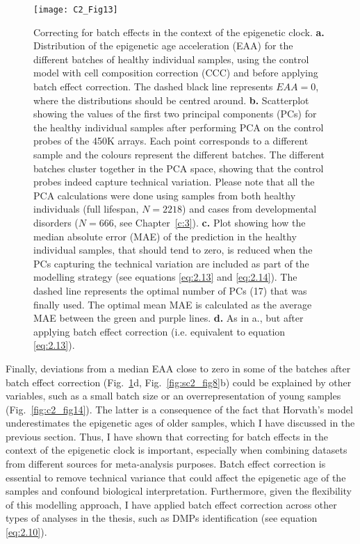 \begin{figure}[htbp!] 
	\centering
	\texttt{[image: C2\_Fig13]}
	\vspace*{2mm}    
	\caption[Correcting for batch effects in the context of the epigenetic clock]{Correcting for batch effects in the context of the epigenetic clock. \textbf{a.} Distribution of the epigenetic age acceleration (EAA) for the different batches of healthy individual samples, using the control model with cell composition correction (CCC) and before applying batch effect correction. The dashed black line represents $EAA = 0$, where the distributions should be centred around. \textbf{b.} Scatterplot showing the values of the first two principal components (PCs) for the healthy individual samples after performing PCA on the control probes of the 450K arrays. Each point corresponds to a different sample and the colours represent the different batches. The different batches cluster together in the PCA space, showing that the control probes indeed capture technical variation. Please note that all the PCA calculations were done using samples from both healthy individuals (full lifespan, $N=2218$) and cases from developmental disorders ($N=666$, see Chapter~\ref{c:3}). \textbf{c.} Plot showing how the median absolute error (MAE) of the prediction in the healthy individual samples, that should tend to zero, is reduced when the PCs capturing the technical variation are included as part of the modelling strategy (see equations \ref{eq:2.13} and \ref{eq:2.14}). The dashed line represents the optimal number of PCs (17) that was finally used. The optimal mean MAE is calculated as the average MAE between the green and purple lines. \textbf{d.} As in a., but after applying batch effect correction (i.e. equivalent to equation \ref{eq:2.13}).}
	\label{fig:c2_fig13}
\end{figure}

\bigskip

Finally, deviations from a median EAA close to zero in some of the batches after batch effect correction (Fig.~\ref{fig:c2_fig13}d, Fig.~\ref{fig:sc2_fig8}b) could be explained by other variables, such as a small batch size or an overrepresentation of young samples (Fig.~\ref{fig:c2_fig14}). The latter is a consequence of the fact that Horvath’s model underestimates the epigenetic ages of older samples, which I have discussed in the previous section. Thus, I have shown that correcting for batch effects in the context of the epigenetic clock is important, especially when combining datasets from different sources for meta-analysis purposes. Batch effect correction is essential to remove technical variance that could affect the epigenetic age of the samples and confound biological interpretation. Furthermore, given the flexibility of this modelling approach, I have applied batch effect correction across other types of analyses in the thesis, such as DMPs identification (see equation \ref{eq:2.10}).

